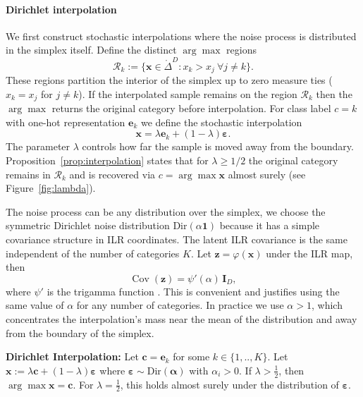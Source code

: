 \paragraph{Dirichlet interpolation}
We first construct stochastic interpolations where the noise process is distributed in the simplex itself. Define the distinct $\arg\max$ regions
\begin{equation}    
    \mathcal{R}_k := \{ \boldsymbol{x}\in \mathring \Delta^{D} : x_k > x_j\ \forall j\neq k\}.
    \label{eq:interpolation}
\end{equation}
These regions partition the interior of the simplex up to zero measure ties ($x_k=x_j$ for $j\neq k$).
If the interpolated sample remains on the region $\mathcal{R}_k$ then the $\arg \max$ returns the original category before interpolation. For class label $c=k$ with one-hot representation $\boldsymbol{e}_k$ we define the stochastic interpolation
\begin{equation}
\boxed{
    {\boldsymbol{x}} = \lambda \boldsymbol{e}_k + (1-\lambda) \boldsymbol{\varepsilon}.
}
\end{equation}
The parameter $\lambda$ controls how far the sample is moved away from the boundary. 
Proposition~\ref{prop:interpolation} states that for $\lambda\geq 1/2$ the original category remains in $\mathcal{R}_k$ and is recovered via $c = \arg\max \boldsymbol{x}$ almost surely (see Figure~\ref{fig:lambda}).

The noise process can be any distribution over the simplex, we choose the symmetric Dirichlet noise distribution $\mathrm{Dir}(\alpha\boldsymbol{1})$ because it has a simple covariance structure in ILR coordinates. The latent ILR covariance is the same independent of the number of categories $K$. Let $\boldsymbol{z} = \varphi(\boldsymbol{x})$ under the ILR map, then
\begin{equation*}
\operatorname{Cov}(\boldsymbol{z})=\psi'(\alpha)\,\mathbf{I}_{D},
\end{equation*}
where $\psi'$ is the trigamma function \citep{Aitchison1986}. This is convenient and justifies using the same value of $\alpha$ for any number of categories. In practice we use $\alpha>1$, which concentrates the interpolation's mass near the mean of the distribution and away from the boundary of the simplex.

\begin{proposition} \label{prop:interpolation}
\textbf{Dirichlet Interpolation:}
Let $\boldsymbol{c} = \boldsymbol{e}_k$ for some $k\in\{1,..,K\}$. Let ${\boldsymbol{x}} := \lambda \boldsymbol{c} + (1-\lambda) \boldsymbol{\varepsilon}$
where $\boldsymbol{\varepsilon} \sim \mathrm{Dir}(\boldsymbol{\alpha})$ with $\alpha_i > 0$.
If $\lambda > \tfrac{1}{2}$, then $\arg\max {\boldsymbol{x}} = \boldsymbol{c}$. For $\lambda = \tfrac{1}{2}$, this holds almost surely under the distribution of $\boldsymbol{\varepsilon}$.
\end{proposition}


